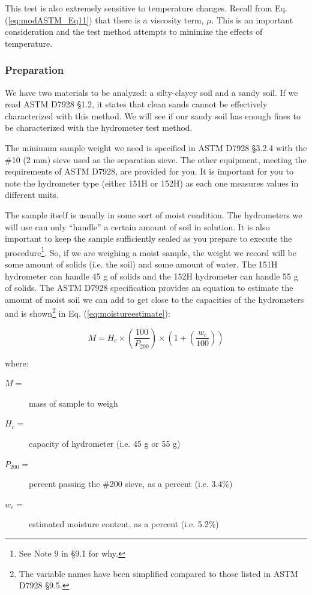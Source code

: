 \documentclass[12pt]{article}
\begin{document}
This test is also extremely sensitive to temperature changes. Recall from Eq. (\ref{eq:modASTM_Eq11}) that there is a viscosity term, $\mu$. This is an important consideration and the test method attempts to minimize the effects of temperature.

\subsubsection{Preparation}
We have two materials to be analyzed: a silty-clayey soil and a sandy soil. If we read ASTM D7928 \S1.2, it states that clean sands cannot be effectively characterized with this method. We will see if our sandy soil has enough fines to be characterized with the hydrometer test method.

The minimum sample weight we need is specified in ASTM D7928 \S3.2.4 with the \#10 (2 mm) sieve used as the separation sieve. The other equipment, meeting the requirements of ASTM D7928, are provided for you. It is important for you to note the hydrometer type (either 151H or 152H) as each one measures values in different units.

The sample itself is usually in some sort of moist condition. The hydrometers we will use can only ``handle'' a certain amount of soil in solution. It is also important to keep the sample sufficiently sealed as you prepare to execute the procedure\footnote{See Note 9 in \S9.1 for why.}. So, if we are weighing a moist sample, the weight we record will be some amount of solids (i.e. the soil) and some amount of water. The 151H hydrometer can handle 45 g of solids and the 152H hydrometer can handle 55 g of solids. The ASTM D7928 specification provides an equation to estimate the amount of moist soil we can add to get close to the capacities of the hydrometers and is shown\footnote{The variable names have been simplified compared to those listed in ASTM D7928 \S9.5.} in Eq. (\ref{eq:moistureestimate}):

\begin{equation}
    M=H_c\times \left(\dfrac{100}{P_{200}}\right)\times \left(1+\left(\dfrac{w_c}{100}\right)\right)
    \label{eq:moistureestimate}
\end{equation}

where:
\begin{description}
\item[$M=$]mass of sample to weigh
\item[$H_c=$] capacity of hydrometer (i.e. 45 g or 55 g)
\item[$P_{200}=$] percent passing the \#200 sieve, as a percent (i.e. 3.4\%)
\item[$w_c=$] estimated moisture content, as a percent (i.e. 5.2\%)
\end{description}
\end{document}
